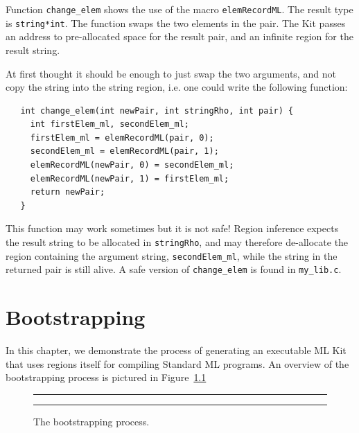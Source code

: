 \documentclass[12pt]{book}
\begin{document}
\begin{example}\label{change_elem.ex}
  Function \texttt{change\_elem} shows the use of
  the macro \texttt{elemRecordML}. The result type is \texttt{string*int}. The
  function swaps the two elements in the pair. The Kit passes an address to
  pre-allocated space for the result pair, and an infinite region for the
  result string.
  
  At first thought it should be enough to just swap the two arguments, and
  not copy the string into the string region, i.e. one could write the
  following function:
\begin{verbatim}
   int change_elem(int newPair, int stringRho, int pair) {
     int firstElem_ml, secondElem_ml;
     firstElem_ml = elemRecordML(pair, 0);
     secondElem_ml = elemRecordML(pair, 1);
     elemRecordML(newPair, 0) = secondElem_ml;
     elemRecordML(newPair, 1) = firstElem_ml;
     return newPair;
   }
\end{verbatim}
  This function may work sometimes but it is not safe! Region
  inference expects the result string to be allocated in
  \texttt{stringRho}, and may therefore de-allocate the region containing
  the argument string, \verb|secondElem_ml|, while the string in the
  returned pair is still alive. A safe version of \verb|change_elem| is
  found in \verb|my_lib.c|.
\end{example}

\chapter{Bootstrapping}
\label{bootstrap.sec}

%
%

In this chapter, we demonstrate the process of generating an
executable ML Kit that uses regions itself for compiling Standard ML
programs. An overview of the bootstrapping process is pictured in
Figure~\ref{bootstrap.fig}

\begin{figure}
\hrule\medskip
\begin{center}
\end{center}
\caption{The bootstrapping process.}
\label{bootstrap.fig}
\medskip\hrule
\end{figure}
\end{document}

